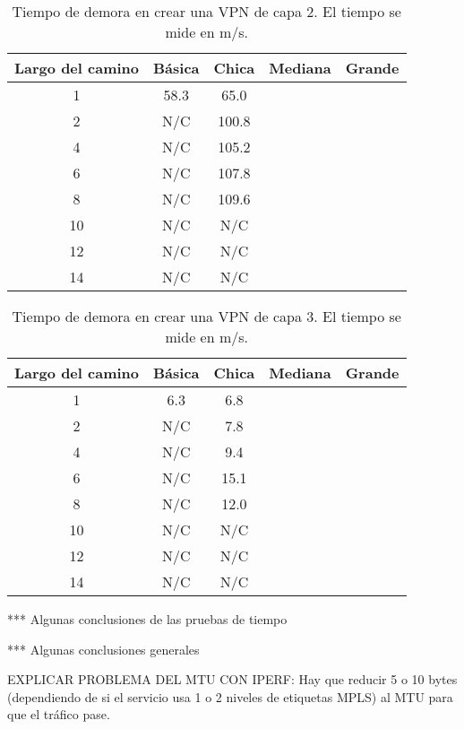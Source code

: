 \begin{table}[ht]
	\caption{Tiempo de demora en crear una VPN de capa 2. El tiempo se mide en m/s.}
	\centering 
	\begin{tabular}{c c c c c}
		\hline\hline
		Largo del camino & Básica & Chica & Mediana  & Grande \\ [0.5ex]
		\hline
		1 & 58.3 & 65.0 &  &  \\
		2 & N/C & 100.8 &  &  \\
		4 & N/C & 105.2 &  &  \\
		6 & N/C & 107.8 &  &  \\
		8 & N/C & 109.6 &  &  \\
		10 & N/C & N/C &  &  \\
		12 & N/C & N/C &  &  \\
		14 & N/C & N/C &  &  \\ [1ex]
		\hline
	\end{tabular}
	\label{table:tiempo_vpn_2}
\end{table}

\begin{table}[ht]
	\caption{Tiempo de demora en crear una VPN de capa 3. El tiempo se mide en m/s.}
	\centering 
	\begin{tabular}{c c c c c}
		\hline\hline
		Largo del camino & Básica & Chica & Mediana  & Grande \\ [0.5ex]
		\hline
		1 & 6.3 & 6.8 &  &  \\
		2 & N/C & 7.8 &  &  \\
		4 & N/C & 9.4 &  &  \\
		6 & N/C & 15.1 &  &  \\
		8 & N/C & 12.0 &  &  \\
		10 & N/C & N/C &  &  \\
		12 & N/C & N/C &  &  \\
		14 & N/C & N/C &  &  \\ [1ex]
		\hline
	\end{tabular}
	\label{table:tiempo_vpn_3}
\end{table}
*** Algunas conclusiones de las pruebas  de tiempo

*** Algunas conclusiones generales

EXPLICAR PROBLEMA DEL MTU CON IPERF: Hay que reducir 5 o 10 bytes (dependiendo de si el servicio usa 1 o 2 niveles de etiquetas MPLS) al MTU para que el tráfico pase.\\

